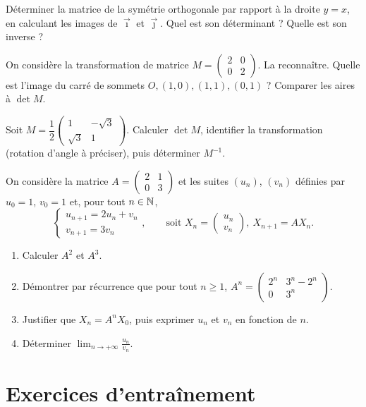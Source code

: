 \exo{} Déterminer la matrice de la symétrie orthogonale par rapport à la droite $y=x$, en
calculant les images de $\vec\imath$ et $\vec\jmath$. Quel est son déterminant ? Quelle est son inverse ?

\exo{} On considère la transformation de matrice $M=\begin{pmatrix}2&0\\0&2\end{pmatrix}$.
La reconnaître. Quelle est l'image du carré de sommets $O,(1,0),(1,1),(0,1)$ ? Comparer les aires
à $\det M$.

\exo{} Soit $M=\dfrac12\begin{pmatrix}1&-\sqrt3\\\sqrt3&1\end{pmatrix}$. Calculer $\det M$,
identifier la transformation (rotation d'angle à préciser), puis déterminer $M^{-1}$.

\exo{} On considère la matrice $A=\begin{pmatrix}2&1\\0&3\end{pmatrix}$ et les suites
$(u_n)$, $(v_n)$ définies par $u_0=1$, $v_0=1$ et, pour tout $n\in\mathbb{N}$,
\[
\left\{\begin{array}{l}u_{n+1}=2u_n+v_n\\ v_{n+1}=3v_n\end{array}\right.,\qquad
\text{soit }X_n=\begin{pmatrix}u_n\\v_n\end{pmatrix},\ X_{n+1}=A X_n.
\]
\begin{enumerate}[label=\arabic*)]
\item Calculer $A^2$ et $A^3$.
\item Démontrer par récurrence que pour tout $n\ge1$,
$A^n=\begin{pmatrix}2^n & 3^n-2^n\\ 0 & 3^n\end{pmatrix}$.
\item Justifier que $X_n=A^n X_0$, puis exprimer $u_n$ et $v_n$ en fonction de $n$.
\item Déterminer $\displaystyle\lim_{n\to+\infty}\frac{u_n}{v_n}$.
\end{enumerate}

\section{Exercices d'entraînement}

